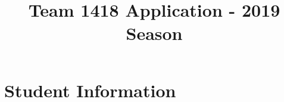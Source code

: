 \documentclass{article}
\begin{document}
\title{Team 1418 Application - 2019 Season}
\maketitle

\section{Student Information}
\end{document}
